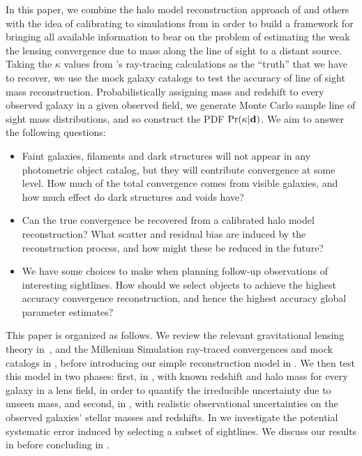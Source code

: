 \documentclass[useAMS,usenatbib]{mn2e}
\begin{document}
In this paper, we combine the halo model reconstruction approach of
\citeauthor{WongEtal} and others with the idea of calibrating to
simulations from \citeauthor{SuyuEtal2009} in order  to build a
framework for bringing all available information to bear on the problem
of estimating the weak the lensing convergence due to mass along the
line of sight to a distant source.  Taking the $\kappa$ values from
\citeauthor{HilbertEtal2009}'s ray-tracing calculations as the ``truth''
that we have to recover, we use the \MS mock galaxy catalogs to test the
accuracy of line of sight mass reconstruction. Probabilistically
assigning mass and redshift to every observed galaxy in a given observed
field, we generate Monte Carlo sample line of sight mass distributions,
and so construct the PDF ${\rm Pr}(\kappa|{\mathbf{d}})$.  We aim to answer the
following questions: 

\begin{itemize}

\item Faint galaxies, filaments and dark structures will not appear in
any photometric object catalog, but they will contribute convergence at
some level. How much of the total convergence comes from visible
galaxies, and how much effect do dark structures and voids have? 

\item Can the true convergence be recovered from a calibrated halo model
reconstruction? What scatter and residual bias are induced by the
reconstruction process, and how might these be reduced in the future? 

\item We have some choices to make when planning follow-up observations
of interesting sightlines. How should we select objects to achieve the
highest accuracy convergence reconstruction, and hence the highest
accuracy global parameter estimates?

\end{itemize}


This paper is organized as follows. We review the relevant gravitational
lensing theory in~, and the Millenium Simulation
ray-traced convergences and mock catalogs in , before
introducing our simple reconstruction  model in . We
then test this model in two phases: first, in , with
known redshift and halo mass for every galaxy in a lens field, in order
to quantify the irreducible uncertainty due to unseen mass, and second,
in , with realistic observational uncertainties on
the observed galaxies' stellar masses and redshifts. In
 we investigate the potential systematic error induced
by selecting a subset of sightlines. We discuss our results in
 before concluding in .
\end{document}
